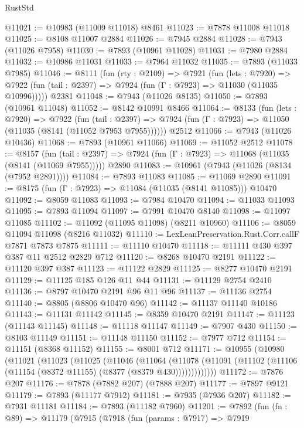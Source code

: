 \begin{lexlean}{RustStd}
\begin{coremodule}
@11021 := @10983 (@11009 @11018) @8461
@11023 := @7878 @11008 @11018
@11025 := @8108 @11007 @2884
@11026 := @7945 @2884
@11028 := @7943 (@11026 @7958)
@11030 := @7893 (@10961 @11028)
@11031 := @7980 @2884
@11032 := @10986 @11031
@11033 := @7964 @11032
@11035 := @7893 (@11033 @7985)
@11046 := @8111
    (fun (rty : @2109) =>
    @7921
      (fun (lets : @7920) =>
      @7922 (fun (tail : @2397) => @7924 (fun (Γ : @7923) => @11030 (@11035 @10996)))))
    @2381
@11048 := @7943 (@11026 @8135)
@11050 := @7893 (@10961 @11048)
@11052 := @8142 @10991 @8466
@11064 := @8133
    (fun (lets : @7920) =>
    @7922
      (fun (tail : @2397) =>
      @7924 (fun (Γ : @7923) => @11050 (@11035 (@8141 (@11052 @7953 @7955))))))
    @2512
@11066 := @7943 (@11026 @10436)
@11068 := @7893 (@10961 @11066)
@11069 := @11052 @2512
@11078 := @8157
    (fun (tail : @2397) => @7924 (fun (Γ : @7923) => @11068 (@11035 (@8141 (@11069 @7955)))))
    @2890
@11083 := @10961 (@7943 (@11026 (@8134 (@7952 @2891))))
@11084 := @7893 @11083
@11085 := @11069 @2890
@11091 := @8175 (fun (Γ : @7923) => @11084 (@11035 (@8141 @11085))) @10470
@11092 := @8059 @11083
@11093 := @7984 @10470
@11094 := @11033 @11093
@11095 := @7893 @11094
@11097 := @7991 @10470 @8140
@11098 := @11097 @11085
@11102 := @11092 (@11095 @11098) (@8211 @10960)
@11106 := @8059 @11094 @11098 (@8216 @11032)
@11110 := LexLeanPreservation.Rust.Corr.callF @7871 @7873 @7875
@11111 := @11110 @10470
@11118 := @11111 @430 @397 @387 @11 @2512 @2829 @712
@11120 := @8268 @10470 @2191
@11122 := @11120 @397 @387
@11123 := @11122 @2829
@11125 := @8277 @10470 @2191
@11129 := @11125 @185 @126 @11 @44
@11131 := @11129 @2754 @2410
@11136 := @8797 @10470 @2191 @96 @11 @96
@11137 := @11136 @2754
@11140 := @8805 (@8806 @10470 @96)
@11142 := @11137 @11140 @10186
@11143 := @11131 @11142
@11145 := @8359 @10470 @2191
@11147 := @11123 (@11143 @11145)
@11148 := @11118 @11147
@11149 := @7907 @430
@11150 := @8103 @11149
@11151 := @11148 @11150
@11152 := @7977 @712
@11154 := @11151 (@8368 @11152)
@11155 := @8001 @712
@11171 := @10955
    (@10980
      (@11021
        (@11023
          (@11025
            (@11046
              (@11064
                (@11078
                  (@11091 (@11102 (@11106 (@11154 (@8372 @11155) (@8377 (@8379 @430)))))))))))))
@11172 := @7876 @207
@11176 := @7878 (@7882 @207) (@7888 @207)
@11177 := @7897 @9121
@11179 := @7893 (@11177 @7912)
@11181 := @7935 (@7936 @207)
@11182 := @7931 @11181
@11184 := @7893 (@11182 @7960)
@11201 := @7892
    (fun (fn : @89) =>
    @11179
      (@7915
        (@7918
          (fun (params : @7917) =>
          @7919

\end{coremodule}
\end{lexlean}
